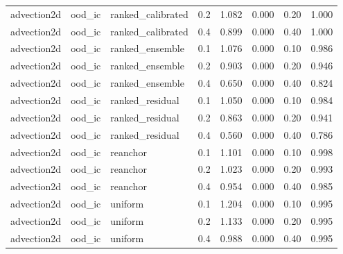 \begin{tabular}{llllrrrr}
advection2d & ood\_ic & ranked\_calibrated & 0.2 & 1.082 & 0.000 & 0.20 & 1.000 \\
advection2d & ood\_ic & ranked\_calibrated & 0.4 & 0.899 & 0.000 & 0.40 & 1.000 \\
advection2d & ood\_ic & ranked\_ensemble & 0.1 & 1.076 & 0.000 & 0.10 & 0.986 \\
advection2d & ood\_ic & ranked\_ensemble & 0.2 & 0.903 & 0.000 & 0.20 & 0.946 \\
advection2d & ood\_ic & ranked\_ensemble & 0.4 & 0.650 & 0.000 & 0.40 & 0.824 \\
advection2d & ood\_ic & ranked\_residual & 0.1 & 1.050 & 0.000 & 0.10 & 0.984 \\
advection2d & ood\_ic & ranked\_residual & 0.2 & 0.863 & 0.000 & 0.20 & 0.941 \\
advection2d & ood\_ic & ranked\_residual & 0.4 & 0.560 & 0.000 & 0.40 & 0.786 \\
advection2d & ood\_ic & reanchor & 0.1 & 1.101 & 0.000 & 0.10 & 0.998 \\
advection2d & ood\_ic & reanchor & 0.2 & 1.023 & 0.000 & 0.20 & 0.993 \\
advection2d & ood\_ic & reanchor & 0.4 & 0.954 & 0.000 & 0.40 & 0.985 \\
advection2d & ood\_ic & uniform & 0.1 & 1.204 & 0.000 & 0.10 & 0.995 \\
advection2d & ood\_ic & uniform & 0.2 & 1.133 & 0.000 & 0.20 & 0.995 \\
advection2d & ood\_ic & uniform & 0.4 & 0.988 & 0.000 & 0.40 & 0.995 \\
\midrule
\bottomrule
\end{tabular}
